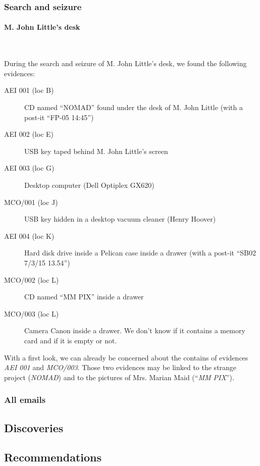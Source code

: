 \subsubsection{Search and seizure}
\paragraph{M. John Little's desk}~\\\par
During the search and seizure of M. John Little's desk, we found the following evidences:
\begin{description}
 \item[AEI 001 (loc B)] CD named \enquote{NOMAD} found under the desk of M. John Little (with a post-it \enquote{FP-05 14:45})
 \item[AEI 002 (loc E)] USB key taped behind M. John Little's screen
 \item[AEI 003 (loc G)] Desktop computer (Dell Optiplex GX620)
 \item[MCO/001 (loc J)] USB key hidden in a desktop vacuum cleaner (Henry Hoover)
 \item[AEI 004 (loc K)] Hard disk drive inside a Pelican case inside a drawer (with a post-it \enquote{SB02 7/3/15 13.54})
 \item[MCO/002 (loc L)] CD named \enquote{MM PIX} inside a drawer
 \item[MCO/003 (loc L)] Camera Canon inside a drawer. We don't know if it contains a memory card and if it is empty or not.
\end{description}
With a first look, we can already be concerned about the contains of evidences \textit{AEI 001} and \textit{MCO/003}. Those two evidences may be linked to the strange project (\textit{NOMAD}) and to the pictures of Mrs. Marian Maid (\enquote{\textit{MM PIX}}).

\subsubsection{All emails}

\subsection{Discoveries}
\subsection{Recommendations}
